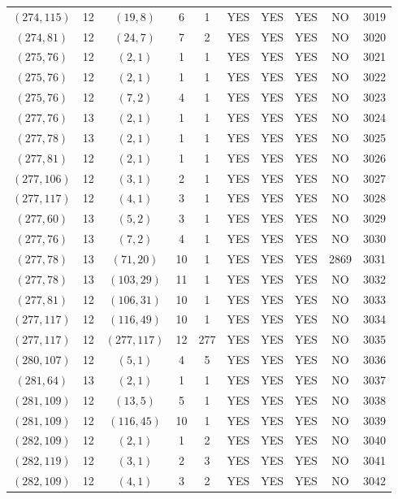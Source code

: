 \begin{longtable}{|c|c|c|c|c|c|c|c|c|c|}
$(274, 115)$ & 12 & $(19, 8)$ & 6 & 1 & YES & YES & YES & NO & 3019\\
$(274, 81)$ & 12 & $(24, 7)$ & 7 & 2 & YES & YES & YES & NO & 3020\\
$(275, 76)$ & 12 & $(2, 1)$ & 1 & 1 & YES & YES & YES & NO & 3021\\
$(275, 76)$ & 12 & $(2, 1)$ & 1 & 1 & YES & YES & YES & NO & 3022\\
$(275, 76)$ & 12 & $(7, 2)$ & 4 & 1 & YES & YES & YES & NO & 3023\\
$(277, 76)$ & 13 & $(2, 1)$ & 1 & 1 & YES & YES & YES & NO & 3024\\
$(277, 78)$ & 13 & $(2, 1)$ & 1 & 1 & YES & YES & YES & NO & 3025\\
$(277, 81)$ & 12 & $(2, 1)$ & 1 & 1 & YES & YES & YES & NO & 3026\\
$(277, 106)$ & 12 & $(3, 1)$ & 2 & 1 & YES & YES & YES & NO & 3027\\
$(277, 117)$ & 12 & $(4, 1)$ & 3 & 1 & YES & YES & YES & NO & 3028\\
$(277, 60)$ & 13 & $(5, 2)$ & 3 & 1 & YES & YES & YES & NO & 3029\\
$(277, 76)$ & 13 & $(7, 2)$ & 4 & 1 & YES & YES & YES & NO & 3030\\
$(277, 78)$ & 13 & $(71, 20)$ & 10 & 1 & YES & YES & YES & 2869 & 3031\\
$(277, 78)$ & 13 & $(103, 29)$ & 11 & 1 & YES & YES & YES & NO & 3032\\
$(277, 81)$ & 12 & $(106, 31)$ & 10 & 1 & YES & YES & YES & NO & 3033\\
$(277, 117)$ & 12 & $(116, 49)$ & 10 & 1 & YES & YES & YES & NO & 3034\\
$(277, 117)$ & 12 & $(277, 117)$ & 12 & 277 & YES & YES & YES & NO & 3035\\
$(280, 107)$ & 12 & $(5, 1)$ & 4 & 5 & YES & YES & YES & NO & 3036\\
$(281, 64)$ & 13 & $(2, 1)$ & 1 & 1 & YES & YES & YES & NO & 3037\\
$(281, 109)$ & 12 & $(13, 5)$ & 5 & 1 & YES & YES & YES & NO & 3038\\
$(281, 109)$ & 12 & $(116, 45)$ & 10 & 1 & YES & YES & YES & NO & 3039\\
$(282, 109)$ & 12 & $(2, 1)$ & 1 & 2 & YES & YES & YES & NO & 3040\\
$(282, 119)$ & 12 & $(3, 1)$ & 2 & 3 & YES & YES & YES & NO & 3041\\
$(282, 109)$ & 12 & $(4, 1)$ & 3 & 2 & YES & YES & YES & NO & 3042\\

\end{longtable}
